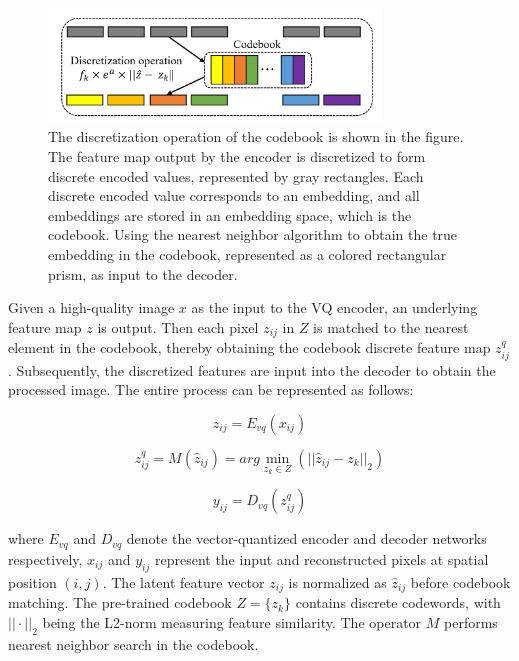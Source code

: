 \documentclass[journal]{IEEEtran}
\begin{document}
\begin{figure}[!t]
	\centering
	\includegraphics[width=3.49in]{images/discretization_operation}
	\caption{The discretization operation of the codebook is shown in the figure. The feature map output by the encoder is discretized to form discrete encoded values, represented by gray rectangles. Each discrete encoded value corresponds to an embedding, and all embeddings are stored in an embedding space, which is the codebook. Using the nearest neighbor algorithm to obtain the true embedding in the codebook, represented as a colored rectangular prism, as input to the decoder.}
	\label{fig2}
\end{figure}

Given a high-quality image $x$ as the input to the VQ encoder, an underlying feature map $z$ is output. Then each pixel $z_{ij}$ in $Z$ is matched to the nearest element in the codebook, thereby obtaining the codebook discrete feature map $z^{q}_{ij}$. Subsequently, the discretized features are input into the decoder to obtain the processed image. The entire process can be represented as follows:

\begin{equation}
	\label{vq_equation_1}
	z_{ij} = E_{vq}(x_{ij})
\end{equation}

\begin{equation}
	\label{vq_equation_2}
	z_{ij}^{q} = M(\widehat{z}_{ij}) = arg \min_{z_{k} \in Z} (|| \widehat{z}_{ij} - z_{k} ||_{2})
\end{equation}

\begin{equation}
	\label{vq_equation_3}
	y_{ij} = D_{vq}(z_{ij}^{q})
\end{equation}

\noindent where $E_{vq}$ and $D_{vq}$ denote the vector-quantized encoder and decoder networks respectively, $x_{ij}$ and $y_{ij}$ represent the input and reconstructed pixels at spatial position $(i,j)$. The latent feature vector $z_{ij}$ is normalized as $\widehat{z}_{ij}$ before codebook matching. The pre-trained codebook $Z = \{z_{k}\}$ contains discrete codewords, with $||\cdot||_{2}$ being the L2-norm measuring feature similarity. The operator $M$ performs nearest neighbor search in the codebook.
\end{document}
